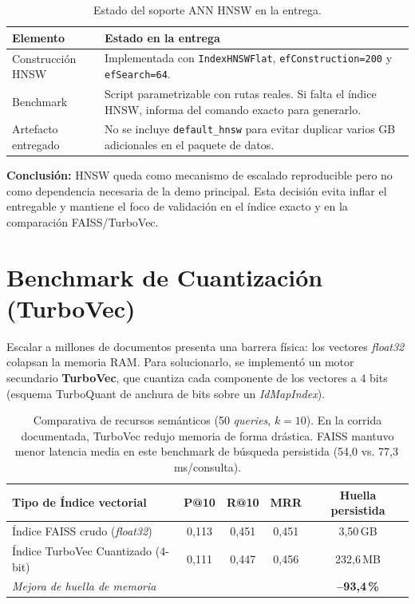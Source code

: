 \documentclass[11pt,a4paper]{article}
\newcommand{\code}[1]{\texttt{#1}}
\begin{document}
\begin{table}[htbp]
\centering
{}
\begin{tabularx}{\textwidth}{l X}
\toprule
\rowcolor{tabheader} \textbf{Elemento} & \textbf{Estado en la entrega} \\
\midrule
Construcción HNSW & Implementada con \code{IndexHNSWFlat}, \code{efConstruction=200} y \code{efSearch=64}. \\
Benchmark & Script parametrizable con rutas reales. Si falta el índice HNSW, informa del comando exacto para generarlo. \\
Artefacto entregado & No se incluye \code{default\_hnsw} para evitar duplicar varios GB adicionales en el paquete de datos. \\
\bottomrule
\end{tabularx}
\caption{Estado del soporte ANN HNSW en la entrega.}
\end{table}

\textbf{Conclusión:} HNSW queda como mecanismo de escalado reproducible pero no como dependencia necesaria de la demo principal. Esta decisión evita inflar el entregable y mantiene el foco de validación en el índice exacto y en la comparación FAISS/TurboVec.

\FloatBarrier

\section{Benchmark de Cuantización (TurboVec)}

Escalar a millones de documentos presenta una barrera física: los vectores \textit{float32} colapsan la memoria RAM. Para solucionarlo, se implementó un motor secundario \textbf{TurboVec}, que cuantiza cada componente de los vectores a 4 bits (esquema TurboQuant de anchura de bits sobre un \textit{IdMapIndex}).

\begin{table}[htbp]
\centering
{}
\begin{tabularx}{\textwidth}{X c c c c}
\toprule
\rowcolor{tabheader} \textbf{Tipo de Índice vectorial} & \textbf{P@10} & \textbf{R@10} & \textbf{MRR} & \textbf{Huella persistida} \\
\midrule
Índice FAISS crudo (\textit{float32}) & 0,113 & 0,451 & 0,451 & 3,50\,GB \\
Índice TurboVec Cuantizado (4-bit) & 0,111 & 0,447 & 0,456 & 232,6\,MB \\
\midrule
\multicolumn{4}{l}{\textit{Mejora de huella de memoria}} & \textbf{--93,4\,\%} \\
\bottomrule
\end{tabularx}
\caption{Comparativa de recursos semánticos (50 \textit{queries}, $k=10$). En la corrida documentada, TurboVec redujo memoria de forma drástica. FAISS mantuvo menor latencia media en este benchmark de búsqueda persistida (54,0 vs. 77,3\,ms/consulta).}
\end{table}
\end{document}
